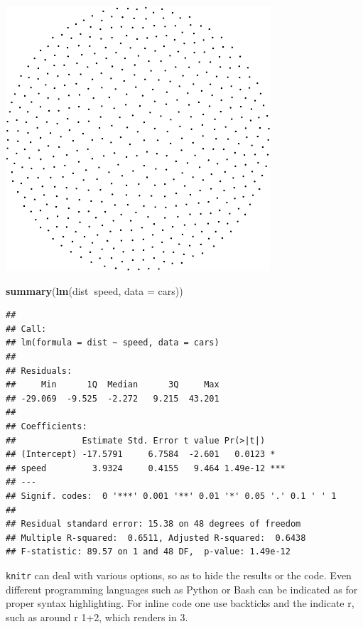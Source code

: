 \documentclass[]{article}
\newenvironment{Shaded}{\begin{snugshade}}{\end{snugshade}}
\newcommand{\KeywordTok}[1]{\textcolor[rgb]{0.13,0.29,0.53}{\textbf{#1}}}
\newcommand{\DataTypeTok}[1]{\textcolor[rgb]{0.13,0.29,0.53}{#1}}
\newcommand{\OperatorTok}[1]{\textcolor[rgb]{0.81,0.36,0.00}{\textbf{#1}}}
\newcommand{\NormalTok}[1]{#1}
\theoremstyle{definition}
\theoremstyle{definition}
\theoremstyle{definition}
\theoremstyle{remark}
\begin{document}
\begin{Shaded}
\end{Shaded}

\includegraphics{ResearchTools_files/figure-latex/unnamed-chunk-49-1.pdf}

\begin{Shaded}
\begin{Highlighting}[]
\KeywordTok{summary}\NormalTok{(}\KeywordTok{lm}\NormalTok{(dist}\OperatorTok{~}\NormalTok{speed, }\DataTypeTok{data =}\NormalTok{ cars))}
\end{Highlighting}
\end{Shaded}

\begin{verbatim}
## 
## Call:
## lm(formula = dist ~ speed, data = cars)
## 
## Residuals:
##     Min      1Q  Median      3Q     Max 
## -29.069  -9.525  -2.272   9.215  43.201 
## 
## Coefficients:
##             Estimate Std. Error t value Pr(>|t|)    
## (Intercept) -17.5791     6.7584  -2.601   0.0123 *  
## speed         3.9324     0.4155   9.464 1.49e-12 ***
## ---
## Signif. codes:  0 '***' 0.001 '**' 0.01 '*' 0.05 '.' 0.1 ' ' 1
## 
## Residual standard error: 15.38 on 48 degrees of freedom
## Multiple R-squared:  0.6511, Adjusted R-squared:  0.6438 
## F-statistic: 89.57 on 1 and 48 DF,  p-value: 1.49e-12
\end{verbatim}

\texttt{knitr} can deal with various options, so as to hide the results
or the code. Even different programming languages such as Python or Bash
can be indicated as for proper syntax highlighting. For inline code one
use backticks and the indicate r, such as around r 1+2, which renders in
3.
\end{document}
